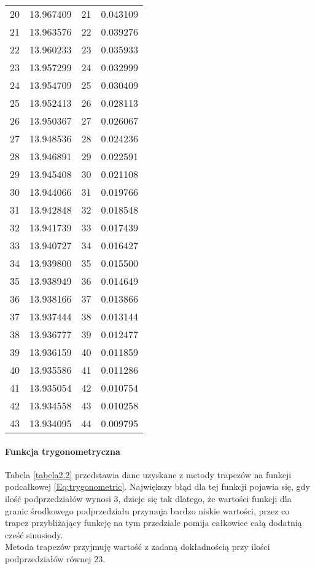 \documentclass[12pt,twoside]{article}
\begin{document}
\begin{table}[ht]
\begin{tabular}{lrrr}
20 &      13.967409 &      21 &   0.043109 \\
21 &      13.963576 &      22 &   0.039276 \\
22 &      13.960233 &      23 &   0.035933 \\
23 &      13.957299 &      24 &   0.032999 \\
24 &      13.954709 &      25 &   0.030409 \\
25 &      13.952413 &      26 &   0.028113 \\
26 &      13.950367 &      27 &   0.026067 \\
27 &      13.948536 &      28 &   0.024236 \\
28 &      13.946891 &      29 &   0.022591 \\
29 &      13.945408 &      30 &   0.021108 \\
30 &      13.944066 &      31 &   0.019766 \\
31 &      13.942848 &      32 &   0.018548 \\
32 &      13.941739 &      33 &   0.017439 \\
33 &      13.940727 &      34 &   0.016427 \\
34 &      13.939800 &      35 &   0.015500 \\
35 &      13.938949 &      36 &   0.014649 \\
36 &      13.938166 &      37 &   0.013866 \\
37 &      13.937444 &      38 &   0.013144 \\
38 &      13.936777 &      39 &   0.012477 \\
39 &      13.936159 &      40 &   0.011859 \\
40 &      13.935586 &      41 &   0.011286 \\
41 &      13.935054 &      42 &   0.010754 \\
42 &      13.934558 &      43 &   0.010258 \\
43 &      13.934095 &      44 &   0.009795 \\
\bottomrule
\end{tabular}
\end{table}


\paragraph{Funkcja trygonometryczna}

Tabela \eqref{tabela2.2} przedstawia dane uzyskane z metody trapezów na funkcji podcałkowej \eqref{Eq:trygonometric}. Największy błąd dla tej funkcji pojawia się, gdy ilość podprzedziałów wynosi 3, dzieje się tak dlatego, że wartości funkcji dla granic środkowego podprzedziału przymuja bardzo niskie wartości, przez co trapez przybliżający funkcję na tym przedziale pomija całkowice całą dodatnią cześć sinusiody.\\
Metoda trapezów przyjmuję wartość z zadaną dokładnością przy ilości podprzedziałów równej 23.
\end{document}
